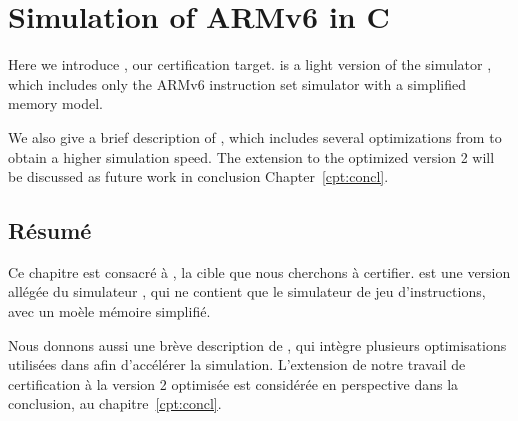 \chapter{Simulation of ARMv6 in C}
\label{cpt:carm}



Here we introduce \simlight, our certification target.
\simlight is a light version of the simulator \simsoc,
which includes only the ARMv6 instruction set simulator
with a simplified memory model.

We also give a brief description of ,
which includes several optimizations from \simsoc
to obtain a higher simulation speed.
The extension to the optimized version 2 will be discussed as future work in
conclusion Chapter~\ref{cpt:concl}.



\section*{Résumé}

\begin{resume}
Ce chapitre est consacré à \simlight, la cible que nous cherchons à certifier.
\simlight est une version allégée du simulateur \simsoc,
qui ne contient que le simulateur de jeu d'instructions,
avec un moèle mémoire simplifié.

Nous donnons aussi une brève description de ,
qui intègre plusieurs optimisations utilisées dans \simsoc
afin d'accélérer la simulation.
L'extension de notre travail de certification à la version 2 optimisée
est considérée en perspective dans la conclusion,
au chapitre~\ref{cpt:concl}.
\end{resume}


